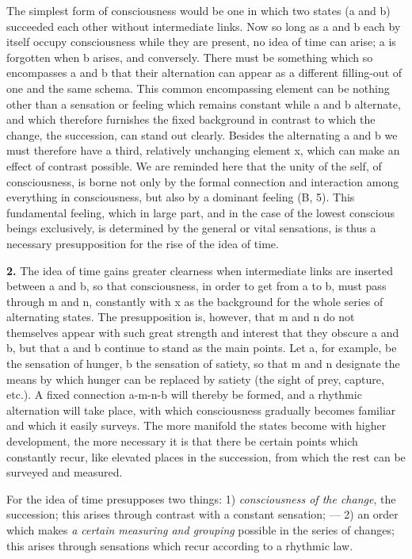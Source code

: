 \documentclass[12pt,a4paper]{book}
\newcommand{\opage}[1]{\marginnote{\footnotesize\textit{[#1]}}}
\begin{document}
The simplest form of consciousness would be one in which two states (a
and b) succeeded each other without intermediate links. Now so long as a
and b each by itself occupy consciousness while they are present, no
idea of time can arise; a is forgotten when b arises, and conversely.
There must be something which so encompasses a and b that their
alternation can appear as a different filling-out of one and the same
schema. This common encompassing element can be nothing other than a
sensation or feeling which remains constant while a and b alternate, and
which therefore
\opage{228}furnishes the fixed background in contrast to which the
change, the succession, can stand out clearly. Besides the alternating a
and b we must therefore have a third, relatively unchanging element x,
which can make an effect of contrast possible. We are reminded here that
the unity of the self, of consciousness, is borne not only by the formal
connection and interaction among everything in consciousness, but also
by a dominant feeling (B, 5). This fundamental feeling, which in large
part, and in the case of the lowest conscious beings exclusively, is
determined by the general or vital sensations, is thus a necessary
presupposition for the rise of the idea of time.

\textbf{2.} The idea of time gains greater clearness when intermediate
links are inserted between a and b, so that consciousness, in order to
get from a to b, must pass through m and n, constantly with x as the
background for the whole series of alternating states. The presupposition
is, however, that m and n do not themselves appear with such great
strength and interest that they obscure a and b, but that a and b
continue to stand as the main points. Let a, for example, be the
sensation of hunger, b the sensation of satiety, so that m and n
designate the means by which hunger can be replaced by satiety (the
sight of prey, capture, etc.). A fixed connection a-m-n-b will thereby be
formed, and a rhythmic alternation will take place, with which
consciousness gradually becomes familiar and which it easily surveys. The
more manifold the states become with higher development, the more
necessary it is that there be certain points which constantly recur,
like elevated places in the succession, from which the rest can be
surveyed and measured.

For the idea of time presupposes two things: 1) \emph{consciousness of
the change}, the succession; this arises through contrast with a
constant sensation; --- 2) an order which makes \emph{a certain measuring
and grouping} possible in the series of changes; this arises through
sensations which recur according to a rhythmic law.
\end{document}
